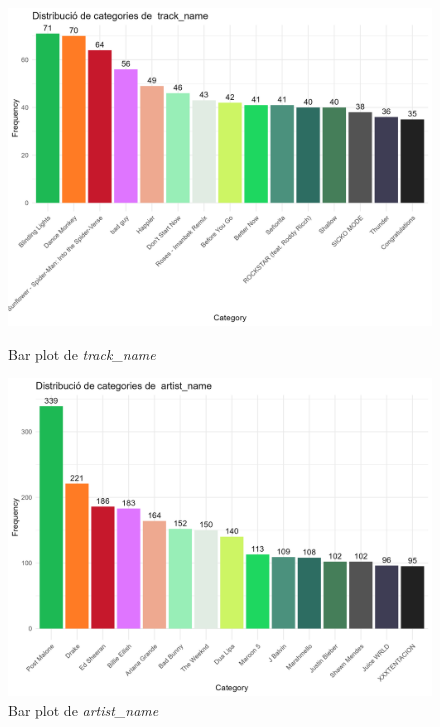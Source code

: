 \begin{figure}[H]
\centering
    \begin{minipage}{.4\textwidth}
        \centering
        \includegraphics[width=0.95\linewidth]{Images/2_Univariate/bar_track_name.png}
        \caption{Bar plot de \textit{track\_name}}
        \label{fig:UnivariateR_track}
    \end{minipage}%
    \begin{minipage}{.4\textwidth}
        \centering
        \includegraphics[width=0.95\linewidth]{Images/2_Univariate/bar_artist_name.png}
        \caption{Bar plot de \textit{artist\_name}}
        \label{fig:UnivariateR_artist}
    \end{minipage}%
\end{figure}

